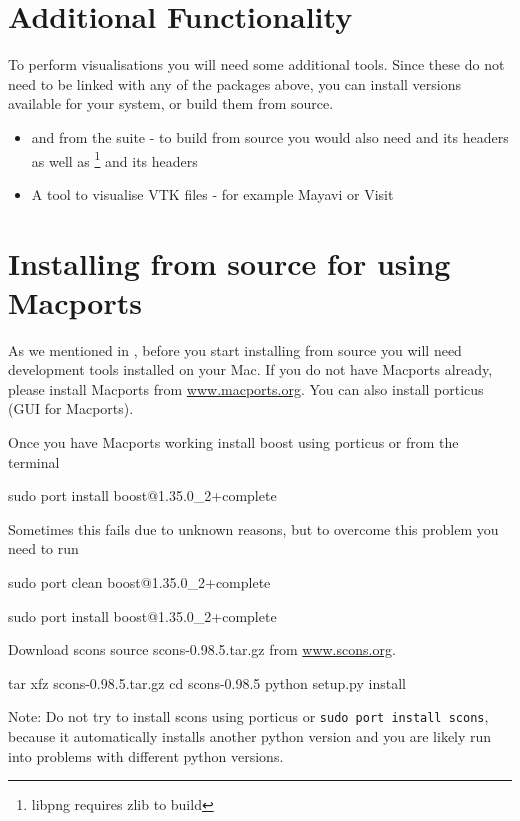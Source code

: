\section{Additional Functionality}\label{sec:macaddfunc}
To perform visualisations you will need some additional tools.
Since these do not need to be linked with any of the packages above, you can install versions available for your
system, or build them from source.
\begin{itemize}
\item {} and  from the  suite - to build from source 
you would also need  and its headers as well as \footnote{libpng requires zlib to build} and its headers
\item A tool to visualise VTK files - for example Mayavi or Visit
\end{itemize}


\section{Installing from source for \macosx using Macports}
\label{sec:srcmacports}

As we mentioned in , before you start installing from source you will need \macosx development tools installed on your Mac. 
If you do not have Macports already, please install Macports from \url{www.macports.org}. You can also install porticus (GUI for Macports).
 
Once you have Macports working install boost using porticus or from the terminal 
\begin{shellCode}
sudo port install boost@1.35.0_2+complete
\end{shellCode}
Sometimes this fails due to unknown reasons, but to overcome this problem you need to run
\begin{shellCode}
sudo port clean boost@1.35.0_2+complete

sudo port install boost@1.35.0_2+complete
 \end{shellCode}
  
Download scons source scons-0.98.5.tar.gz from \url{www.scons.org}.
\begin{shellCode}
tar xfz scons-0.98.5.tar.gz
cd scons-0.98.5
python setup.py install
\end{shellCode}

Note: Do not try to install scons using porticus or \texttt{sudo port install scons}, because it automatically installs another python version and you are likely run into problems with different python versions.  
 
